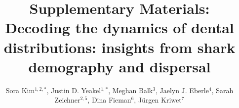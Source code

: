\documentclass[]{rsos}%
\begin{document}
\title{Supplementary Materials: Decoding the dynamics of dental distributions: insights from shark demography and dispersal}


\author{%
Sora Kim$^{1,2,*}$, Justin D. Yeakel$^{1,*}$, Meghan Balk$^{3}$, Jaelyn J. Eberle$^{4}$, Sarah Zeichner$^{2,5}$, Dina Fieman$^{6}$, J\"urgen Kriwet$^{7}$}

\address{\footnotesize{$^{1}$School of Natural Science, University of California Merced,$^{2}$Department of Geophysical Sciences, University of Chicago, $^{3}$National Ecological Observatory Network, $^{4}$Department of Geological Sciences and Museum of Natural History, University of Colorado,
$^{5}$Division of Geological and Planetary Sciences, California Institute of Technology, $^{6}$School of Geography, Environment, and Earth Sciences, Victoria University of Wellington, $^{7}$Department of Paleontology, University of Vienna
$^{*}$Contributed equally}}


\subject{paleontology, ecology, body size, migration, nursery}





\maketitle

\end{document}
